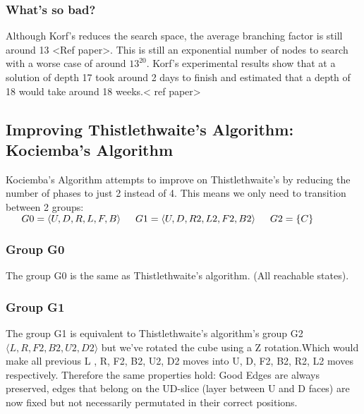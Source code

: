 \documentclass[titlepage]{report}[12pt]
\begin{document}
\subsubsection{What's so bad?}
Although Korf's reduces the search space, the average branching factor is still around 13 <Ref paper>. This is still an exponential number of nodes to search with a worse case of around \begin{math} 13^20 \end{math}. Korf's experimental results show that at a solution of depth 17 took around 2 days to finish and estimated that a depth of 18 would take around 18 weeks.< ref paper>

\subsection{Improving Thistlethwaite's Algorithm: Kociemba's Algorithm}
Kociemba's Algorithm attempts to improve on Thistlethwaite's by reducing the number of phases to just 2 instead of 4. This means we only need to transition between 2 groups:
\begin{math}
\\
\indent
G0 = \langle U,D,R,L,F,B \rangle
\\
\indent
G1 = \langle U,D,R2,L2,F2,B2 \rangle
\\
\indent
G2 = \{C\} 
\end{math}

\subsubsection{Group G0} The group G0 is the same as Thistlethwaite's algorithm. (All reachable states).

\subsubsection{Group G1} The group G1 is equivalent to Thistlethwaite's algorithm's group G2 \begin{math} \langle L, R, F2,B2,U2,D2 \rangle \end{math} but we've rotated the  cube using a Z rotation.Which would make all previous L , R, F2, B2, U2, D2 moves into U, D, F2, B2, R2, L2 moves respectively. Therefore the same properties hold: Good Edges are always preserved, edges that belong on the UD-slice (layer between U and D faces) are now fixed but not necessarily permutated in their correct positions.
\end{document}
